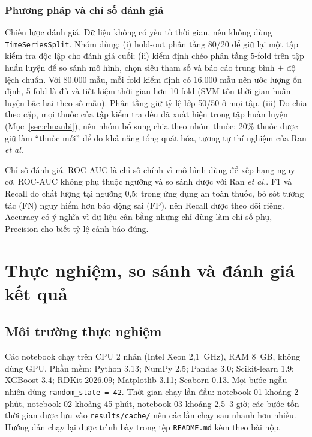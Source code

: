 \documentclass[12pt,a4paper,oneside]{report}
\begin{document}
\subsection{Phương pháp và chỉ số đánh giá}
\label{sec:danhgia}

Chiến lược đánh giá. Dữ liệu không có yếu tố thời gian, nên không dùng
\texttt{TimeSeriesSplit}. Nhóm dùng: (i) hold-out phân tầng 80/20 để giữ
lại một tập kiểm tra độc lập cho đánh giá cuối; (ii) kiểm định chéo phân
tầng 5-fold trên tập huấn luyện để so sánh mô hình, chọn siêu tham số và báo
cáo trung bình $\pm$ độ lệch chuẩn. Với 80.000 mẫu, mỗi fold kiểm định có 16.000
mẫu nên ước lượng ổn định, 5 fold là đủ và tiết kiệm thời gian hơn 10 fold
(SVM tốn thời gian huấn luyện bậc hai theo số mẫu). Phân tầng giữ tỷ lệ lớp 50/50
ở mọi tập. (iii) Do chia theo cặp, mọi thuốc của tập kiểm tra đều đã xuất hiện
trong tập huấn luyện (Mục~\ref{sec:chuanbi}), nên nhóm bổ sung chia theo
nhóm thuốc: 20\% thuốc được giữ làm ``thuốc mới'' để đo khả năng tổng quát hóa,
tương tự thí nghiệm của Ran \textit{et al.}

Chỉ số đánh giá. ROC-AUC là chỉ số chính vì mô hình dùng để xếp
hạng nguy cơ, ROC-AUC không phụ thuộc ngưỡng và so sánh được với Ran \textit{et
al.}. F1 và Recall đo chất lượng tại ngưỡng 0,5; trong ứng dụng an
toàn thuốc, bỏ sót tương tác (FN) nguy hiểm hơn báo động sai (FP), nên Recall
được theo dõi riêng. Accuracy có ý nghĩa vì dữ liệu cân bằng nhưng chỉ
dùng làm chỉ số phụ, Precision cho biết tỷ lệ cảnh báo đúng.

\chapter{Thực nghiệm, so sánh và đánh giá kết quả}
\label{chap:thucnghiem}

\section{Môi trường thực nghiệm}
\label{sec:moitruong}

Các notebook chạy trên CPU 2 nhân (Intel Xeon 2,1~GHz), RAM 8~GB, không dùng GPU.
Phần mềm: Python 3.13; NumPy 2.5; Pandas 3.0; Scikit-learn 1.9; XGBoost 3.4;
RDKit 2026.09; Matplotlib 3.11; Seaborn 0.13. Mọi bước ngẫu nhiên dùng
\texttt{random\_state = 42}. Thời gian chạy lần đầu: notebook 01 khoảng 2 phút,
notebook 02 khoảng 45 phút, notebook 03 khoảng 2,5--3 giờ; các
bước tốn thời gian được lưu vào \texttt{results/cache/} nên các lần chạy sau
nhanh hơn nhiều. Hướng dẫn chạy lại được trình bày trong tệp \texttt{README.md}
kèm theo bài nộp.
\end{document}
